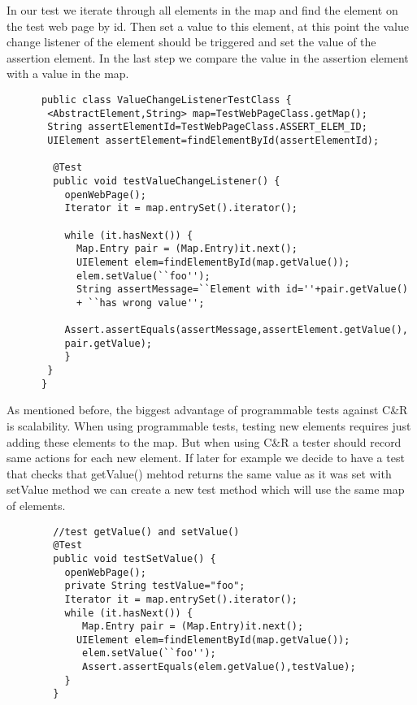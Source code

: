       In our test we iterate through all elements in the map and find the
      element on the test web page by id. Then set a value to this element,
      at this point the value change listener of the element should be triggered and set the value
      of the assertion element. In the last step we compare the value in the
      assertion element with a value in the map.
			
      \begin{lstlisting}
      public class ValueChangeListenerTestClass {
       <AbstractElement,String> map=TestWebPageClass.getMap();
       String assertElementId=TestWebPageClass.ASSERT_ELEM_ID;
       UIElement assertElement=findElementById(assertElementId);
       
        @Test
        public void testValueChangeListener() {
          openWebPage();
          Iterator it = map.entrySet().iterator();
          
          while (it.hasNext()) {
            Map.Entry pair = (Map.Entry)it.next();
            UIElement elem=findElementById(map.getValue());
            elem.setValue(``foo'');
            String assertMessage=``Element with id=''+pair.getValue()
            + ``has wrong value'';
          
          Assert.assertEquals(assertMessage,assertElement.getValue(),
          pair.getValue);
          }
       }
      }
			\end{lstlisting}
  
      As mentioned before, the biggest advantage of programmable tests against
      C\&R is scalability. When using programmable tests, testing new elements
      requires just adding these elements to the map. But when using C\&R a
      tester should record same actions for each new element. If later for
      example we decide to have a test that checks that getValue() mehtod
      returns the same value as it was set with setValue method we can create
      a new test method which will use the same map of elements. 
      \begin{lstlisting}
        //test getValue() and setValue()
        @Test
        public void testSetValue() {
          openWebPage();
          private String testValue="foo";
          Iterator it = map.entrySet().iterator();
          while (it.hasNext()) {
             Map.Entry pair = (Map.Entry)it.next();
            UIElement elem=findElementById(map.getValue());
             elem.setValue(``foo'');  
             Assert.assertEquals(elem.getValue(),testValue);        
          }
        }
      \end{lstlisting}

